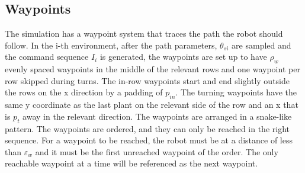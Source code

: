\documentclass[11pt,a4paper,twocolumn]{article}
\begin{document}
\subsection{Waypoints}
The simulation has a waypoint system that traces the path the robot should follow. In the i-th environment, after the path parameters, $\theta_{si}$ are sampled and the command sequence $I_i$ is generated, the waypoints are set up to have $\rho_w$ evenly spaced waypoints in the middle of the relevant rows and one waypoint per row skipped during turns. The in-row waypoints start and end slightly outside the rows on the x direction by a padding of $p_{in}$. The turning waypoints have the same y coordinate as the last plant on the relevant side of the row and an x that is $p_{t}$ away in the relevant direction. The waypoints are arranged in a snake-like pattern.
The waypoints are ordered, and they can only be reached in the right sequence. For a waypoint to be reached, the robot must be at a distance of less than $\varepsilon_w$ and it must be the first unreached waypoint of the order. The only reachable waypoint at a time will be referenced as the next waypoint.
\end{document}
